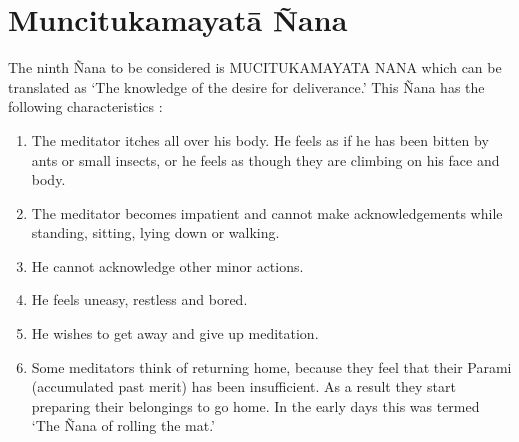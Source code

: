 \documentclass[a5paper,10pt,english]{book}
\begin{document}
\section{Muncitukamayatā Ñana}
\label{\detokenize{progress:muncitukamayata-nana}}
\sphinxAtStartPar
The ninth Ñana to be considered is MUCITUKAMAYATA NANA which can be translated as ‘The knowledge of the desire for deliverance.’ This Ñana has the following characteristics :\sphinxhyphen{}
\begin{enumerate}
%
\item {} 
\sphinxAtStartPar
The meditator itches all over his body. He feels as if he has been bitten by ants or small insects, or he feels as though they are climbing on his face and body.

\item {} 
\sphinxAtStartPar
The meditator becomes impatient and cannot make acknowledgements while standing, sitting, lying down or walking.

\item {} 
\sphinxAtStartPar
He cannot acknowledge other minor actions.

\item {} 
\sphinxAtStartPar
He feels uneasy, restless and bored.

\item {} 
\sphinxAtStartPar
He wishes to get away and give up meditation.

\item {} 
\sphinxAtStartPar
Some meditators think of returning home, because they feel that their Parami (accumulated past merit) has been insufficient. As a result they start preparing their belongings to go home. In the early days this was termed ‘The Ñana of rolling the mat.’

\end{enumerate}
\end{document}
